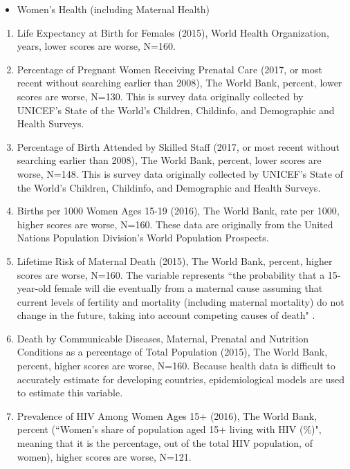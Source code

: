 \begin{itemize}
    \item Women's Health (including Maternal Health)
\end{itemize}
\begin{enumerate}
\item Life Expectancy at Birth for Females (2015), World Health Organization, years, lower scores are worse, N=160. 
\item Percentage of Pregnant Women Receiving Prenatal Care (2017, or most recent without searching earlier than 2008), The World Bank, percent, lower scores are worse, N=130. This is survey data originally collected by UNICEF's State of the World's Children, Childinfo, and Demographic and Health Surveys.
\item Percentage of Birth Attended by Skilled Staff (2017, or most recent without searching earlier than 2008), The World Bank, percent, lower scores are worse, N=148. This is survey data originally collected by UNICEF's State of the World's Children, Childinfo, and Demographic and Health Surveys.
\item Births per 1000 Women Ages 15-19 (2016), The World Bank, rate per 1000, higher scores are worse, N=160. These data are originally from the United Nations Population Division's World Population Prospects.
\item Lifetime Risk of Maternal Death (2015), The World Bank, percent, higher scores are worse, N=160. The variable represents ``the probability that a 15-year-old female will die eventually from a maternal cause assuming that current levels of fertility and mortality (including maternal mortality) do not change in the future, taking into account competing causes of death" \citep{wbopen}.
\item Death by Communicable Diseases, Maternal, Prenatal and Nutrition Conditions as a percentage of Total Population (2015), The World Bank, percent, higher scores are worse, N=160. Because health data is difficult to accurately estimate for developing countries, epidemiological models are used to estimate this variable.
\item Prevalence of HIV Among Women Ages 15+ (2016), The World Bank, percent (``Women’s share of population aged 15+ living with HIV (\%)", meaning that it is the percentage, out of the total HIV population, of women), higher scores are worse, N=121.
\end{enumerate}

